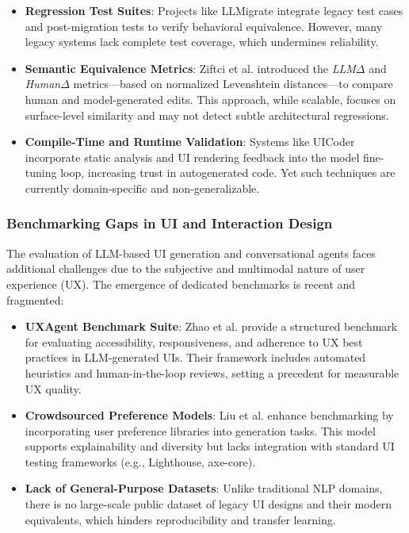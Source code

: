 \documentclass[12pt]{article}
\begin{document}
\begin{itemize}
    \item \textbf{Regression Test Suites}: Projects like LLMigrate \cite{llmigrate2025} integrate legacy test cases and post-migration tests to verify behavioral equivalence. However, many legacy systems lack complete test coverage, which undermines reliability.
    
    \item \textbf{Semantic Equivalence Metrics}: Ziftci et al. \cite{googlemigrate2025} introduced the \textit{LLM$\Delta$} and \textit{Human$\Delta$} metrics—based on normalized Levenshtein distances—to compare human and model-generated edits. This approach, while scalable, focuses on surface-level similarity and may not detect subtle architectural regressions.

    \item \textbf{Compile-Time and Runtime Validation}: Systems like UICoder \cite{wu2024uicoder} incorporate static analysis and UI rendering feedback into the model fine-tuning loop, increasing trust in autogenerated code. Yet such techniques are currently domain-specific and non-generalizable.
\end{itemize}

\subsubsection{Benchmarking Gaps in UI and Interaction Design}

The evaluation of LLM-based UI generation and conversational agents faces additional challenges due to the subjective and multimodal nature of user experience (UX). The emergence of dedicated benchmarks is recent and fragmented:

\begin{itemize}
    \item \textbf{UXAgent Benchmark Suite}: Zhao et al. \cite{zhao2024uxagent} provide a structured benchmark for evaluating accessibility, responsiveness, and adherence to UX best practices in LLM-generated UIs. Their framework includes automated heuristics and human-in-the-loop reviews, setting a precedent for measurable UX quality.
    
    \item \textbf{Crowdsourced Preference Models}: Liu et al. \cite{liu2024crowdgenui} enhance benchmarking by incorporating user preference libraries into generation tasks. This model supports explainability and diversity but lacks integration with standard UI testing frameworks (e.g., Lighthouse, axe-core).

    \item \textbf{Lack of General-Purpose Datasets}: Unlike traditional NLP domains, there is no large-scale public dataset of legacy UI designs and their modern equivalents, which hinders reproducibility and transfer learning.
\end{itemize}
\end{document}
